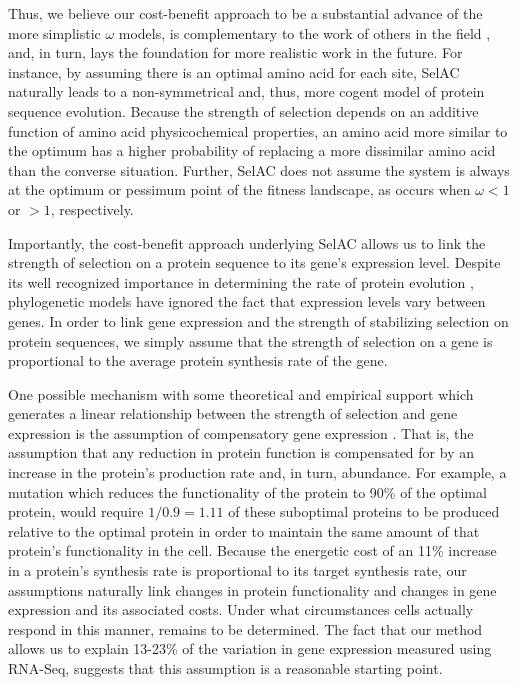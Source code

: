 \documentclass[onecolumn,letterpaper,fleqn,nogrid]{myMBE}%
\newcommand{\PC}{physicochemical\xspace}
\newcommand{\selac}{SelAC\xspace}
\begin{document}
Thus, we believe our cost-benefit approach to be a substantial advance of the more simplistic $\omega$ models, is complementary to the work of others in the field \citep[e.g.][]{ThorneEtAl2012,RodrigueAndLartillot2014}, and, in turn, lays the foundation for more realistic work in the future.
For instance, by assuming there is an optimal amino acid for each site, \selac naturally leads to a non-symmetrical and, thus, more cogent model of protein sequence evolution.
Because the strength of selection depends on an additive function of amino acid \PC properties, an amino acid more similar to the optimum has a higher probability of replacing a more dissimilar amino acid than the converse situation.
Further, \selac does not assume the system is always at the optimum or pessimum point of the fitness landscape, as occurs when $\omega < 1$ or $>1$, respectively.

Importantly, the cost-benefit approach underlying \selac allows us to link the strength of selection on a protein sequence to its gene's expression level.
Despite its well recognized importance in determining the rate of protein evolution \citep[e.g.][]{DrummondEtAl2005,DrummondEtAl2006a}, phylogenetic models have ignored the fact that expression levels vary between genes.
In order to link gene expression and the strength of stabilizing selection on protein sequences, we simply assume that the strength of selection on a gene is proportional to the average protein synthesis rate of the gene.

One possible mechanism with some theoretical and empirical support which generates a linear relationship between the strength of selection and gene expression is the assumption of compensatory gene expression \citep{KingEtAl2015,LermanEtAl2012,ThieleEtAl2012,allison2012, allison2017,brown1997, zanger2013}.
That is, the assumption that any reduction in protein function is compensated for by an increase in the protein's production rate and, in turn, abundance.
For example, a mutation which reduces the functionality of the protein to 90\% of the optimal protein, would require $1/0.9 = 1.11$ of these suboptimal proteins to be produced relative to the optimal protein in order to maintain the same amount of that protein's functionality in the cell.
Because the energetic cost of an 11\% increase in a protein's synthesis rate is proportional to its target synthesis rate, our assumptions naturally link changes in protein functionality and changes in gene expression and its associated costs.
Under what circumstances cells actually respond in this manner, remains to be determined.
The fact that our method allows us to explain 13-23\% of the variation in gene expression measured using RNA-Seq, suggests that this assumption is a reasonable starting point.
\end{document}
